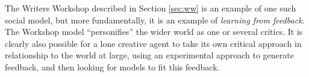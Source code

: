 The Writers Workshop described in Section \ref{sec:ww} is an example
of one such social model, but more fundamentally, it is an example of
\emph{learning from feedback}.  The Workshop model ``personifies'' the
wider world as one or several critics.  It is clearly also possible
for a lone creative agent to take its own critical approach in relationship
to the world at large, using an experimental approach to generate
feedback, and then looking for models to fit this feedback.


